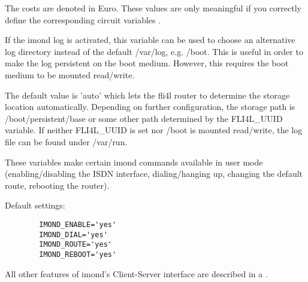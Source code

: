 \begin{description}
{      The costs are denoted in Euro. These values are only meaningful if you
      correctly define the corresponding circuit variables
      }.


    {If the imond log is activated, this variable can be used to choose an
    alternative log directory instead of the default /var/log, e.g. /boot.
    This is useful in order to make the log persistent on the boot medium.
    However, this requires the boot medium to be mounted read/write.

    The default value is 'auto' which lets the fli4l router to determine the
    storage location automatically. Depending on further configuration, the
    storage path is /boot/persistent/base or some other path determined by
    the FLI4L\_UUID variable. If neither FLI4L\_UUID is set nor /boot is mounted
    read/write, the log file can be found under /var/run.}


    {These variables make certain imond commands available in user mode
    (enabling/disabling the ISDN interface, dialing/hanging up, changing the
    default route, rebooting the router).

    Default settings:

\begin{example}
\begin{verbatim}
        IMOND_ENABLE='yes'
        IMOND_DIAL='yes'
        IMOND_ROUTE='yes'
        IMOND_REBOOT='yes'
\end{verbatim}
\end{example}

      All other features of imond's Client-Server interface are described in a
      .}

  \end{description}

